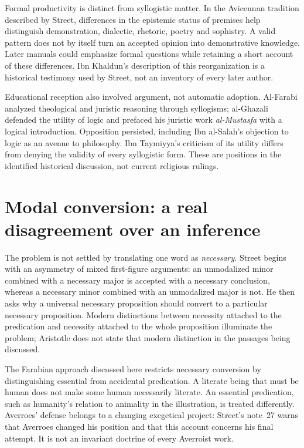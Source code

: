Formal productivity is distinct from syllogistic matter. In the
Avicennan tradition described by Street, differences in the epistemic
status of premises help distinguish demonstration, dialectic, rhetoric,
poetry and sophistry. A valid pattern does not by itself turn an
accepted opinion into demonstrative knowledge. Later manuals could
emphasize formal questions while retaining a short account of these
differences. Ibn Khaldun's description of this reorganization is a
historical testimony used by Street, not an inventory of every later author.
\cite[pp.~251--252, 255--256]{Street2005LogicSupplement}

Educational reception also involved argument, not automatic adoption.
Al-Farabi analyzed theological and juristic reasoning through syllogisms;
al-Ghazali defended the utility of logic and prefaced his juristic work
\emph{al-Mustasfa} with a logical introduction. Opposition persisted,
including Ibn al-Salah's objection to logic as an avenue to philosophy.
Ibn Taymiyya's criticism of its utility differs from denying the validity
of every syllogistic form. These are positions in the identified historical
discussion, not current religious rulings.
\cite[pp.~252--254, 263, notes~17--21]{Street2005LogicSupplement}

\section{Modal conversion: a real disagreement over an inference}
\label{sec:p13-arabic-modal-conversion}

The problem is not settled by translating one word as \emph{necessary}.
Street begins with an asymmetry of mixed first-figure arguments:
an unmodalized minor combined with a necessary major is accepted
with a necessary conclusion, whereas a necessary minor combined
with an unmodalized major is not. He then asks why a universal
necessary proposition should convert to a particular necessary
proposition. Modern distinctions between necessity attached to the
predication and necessity attached to the whole proposition illuminate
the problem; Aristotle does not state that modern distinction in
the passages being discussed.
\cite[pp.~256--257]{Street2005LogicSupplement}

The Farabian approach discussed here restricts necessary conversion
by distinguishing essential from accidental predication. A literate
being that must be human does not make some human necessarily
literate. An essential predication, such as humanity's relation to
animality in the illustration, is treated differently. Averroes' defense
belongs to a changing exegetical project: Street's note~27 warns
that Averroes changed his position and that this account concerns
his final attempt. It is not an invariant doctrine of every Averroist work.
\cite[pp.~257--258, 264, note~27]{Street2005LogicSupplement}

